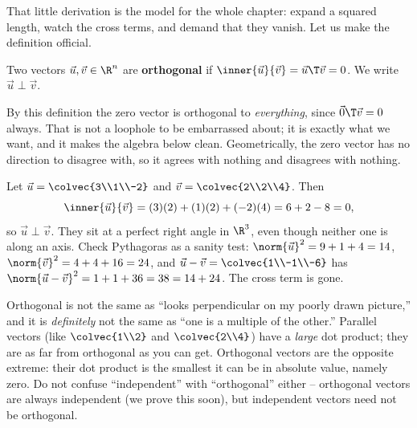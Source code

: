 That little derivation is the model for the whole chapter: expand a squared length, watch the
cross terms, and demand that they vanish. Let us make the definition official.

\begin{definition}\label{ch17:def-orthogonal-vectors}
Two vectors $\vec{u},\vec{v}\in\R^n$ are \textbf{orthogonal} if $\inner{\vec{u}}{\vec{v}}
= \vec{u}\T\vec{v} = 0$. We write $\vec{u}\perp\vec{v}$.
\end{definition}

\begin{remark}
By this definition the zero vector is orthogonal to \emph{everything}, since $\vec{0}\T\vec{v}=0$
always. That is not a loophole to be embarrassed about; it is exactly what we want, and it makes
the algebra below clean. Geometrically, the zero vector has no direction to disagree with, so it
agrees with nothing and disagrees with nothing.
\end{remark}

\begin{example}\label{ch17:first-numeric}
Let $\vec{u}=\colvec{3\\1\\-2}$ and $\vec{v}=\colvec{2\\2\\4}$. Then
\[
  \inner{\vec{u}}{\vec{v}} = (3)(2)+(1)(2)+(-2)(4) = 6+2-8 = 0,
\]
so $\vec{u}\perp\vec{v}$. They sit at a perfect right angle in $\R^3$, even though neither one is
along an axis. Check Pythagoras as a sanity test: $\norm{\vec{u}}^2 = 9+1+4 = 14$,
$\norm{\vec{v}}^2 = 4+4+16 = 24$, and $\vec{u}-\vec{v}=\colvec{1\\-1\\-6}$ has
$\norm{\vec{u}-\vec{v}}^2 = 1+1+36 = 38 = 14+24$. The cross term is gone.
\end{example}

\begin{trapbox}
Orthogonal is not the same as ``looks perpendicular on my poorly drawn picture,'' and it is
\emph{definitely} not the same as ``one is a multiple of the other.'' Parallel vectors (like
$\colvec{1\\2}$ and $\colvec{2\\4}$) have a \emph{large} dot product; they are as far from
orthogonal as you can get. Orthogonal vectors are the opposite extreme: their dot product is the
smallest it can be in absolute value, namely zero. Do not confuse ``independent'' with
``orthogonal'' either -- orthogonal vectors are always independent (we prove this soon), but
independent vectors need not be orthogonal.
\end{trapbox}

